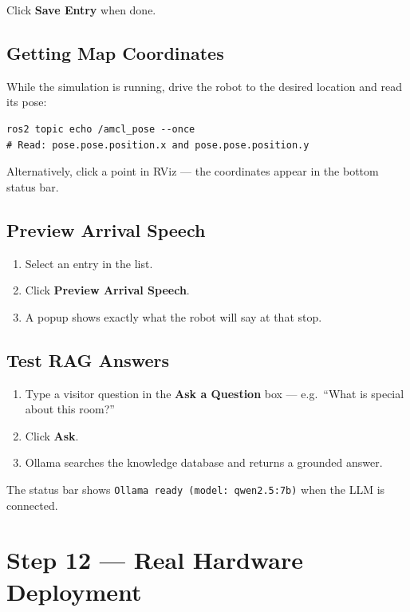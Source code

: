 \documentclass[12pt,a4paper]{report}
\begin{document}
Click \textbf{Save Entry} when done.

\subsection{Getting Map Coordinates}

While the simulation is running, drive the robot to the desired location
and read its pose:

\begin{lstlisting}[style=bashstyle]
ros2 topic echo /amcl_pose --once
# Read: pose.pose.position.x and pose.pose.position.y
\end{lstlisting}

Alternatively, click a point in RViz --- the coordinates appear in the
bottom status bar.

\subsection{Preview Arrival Speech}

\begin{enumerate}[leftmargin=2em]
  \item Select an entry in the list.
  \item Click \textbf{Preview Arrival Speech}.
  \item A popup shows exactly what the robot will say at that stop.
\end{enumerate}

\subsection{Test RAG Answers}

\begin{enumerate}[leftmargin=2em]
  \item Type a visitor question in the \textbf{Ask a Question} box ---
        e.g.\ ``What is special about this room?''
  \item Click \textbf{Ask}.
  \item Ollama searches the knowledge database and returns a grounded answer.
\end{enumerate}

The status bar shows \texttt{Ollama ready (model: qwen2.5:7b)} when the
LLM is connected.

\section{Step 12 --- Real Hardware Deployment}
\end{document}

